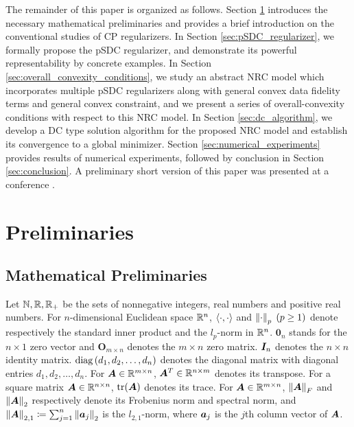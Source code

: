 \documentclass[lettersize,journal]{IEEEtran}
\theoremstyle{plain}%
\theoremstyle{definition}
\theoremstyle{remark}
\begin{document}
The remainder of this paper is organized as follows. Section \ref{sec:preliminaries} introduces the necessary mathematical preliminaries and provides a brief introduction on the conventional studies of CP regularizers. In Section \ref{sec:pSDC_regularizer}, we formally propose the pSDC regularizer, and demonstrate its powerful representability by concrete examples. In Section \ref{sec:overall_convexity_conditions}, we study an abstract NRC model which incorporates multiple pSDC regularizers along with general convex data fidelity terms and general convex constraint, and we present a series of overall-convexity conditions with respect to this NRC model. In Section \ref{sec:dc_algorithm}, we develop a DC type solution algorithm for the proposed NRC model and establish its convergence to a global minimizer. Section \ref{sec:numerical_experiments} provides results of numerical experiments, followed by conclusion in Section \ref{sec:conclusion}. A preliminary short version of this paper was presented at a conference \cite{zhang2022}.

\section{Preliminaries}\label{sec:preliminaries}
\subsection{Mathematical Preliminaries}\label{subsec:notation}
Let $\mathbb{N},\mathbb{R},\mathbb{R}_+$ be the sets of nonnegative integers, real numbers and positive real numbers. For $n$-dimensional Euclidean space $\mathbb{R}^n$, $\langle \cdot, \cdot \rangle$ and $\left\| \cdot \right\|_{p}\;(p\geq 1)$ denote respectively the standard inner product and the $l_p$-norm in $\mathbb{R}^n$. $\mathbf{0}_n$ stands for the $n\times 1$ zero vector and $\mathbf{O}_{m\times n}$ denotes the $m\times n$ zero matrix. $\bm{I}_n$ denotes the $n\times n$ identity matrix. $\mathrm{diag}\left( d_1,d_2,\dots,d_n \right )$ denotes the diagonal matrix with diagonal entries $d_1,d_2,\dots,d_n$. For $\bm{A}\in\mathbb{R}^{m\times n}$, $\bm{A}^T\in\mathbb{R}^{n\times m}$ denotes its transpose. For a square matrix $\bm{A}\in\mathbb{R}^{n\times n}$, $\textrm{tr}(\bm{A})$ denotes its trace. For $\bm{A}\in\mathbb{R}^{m\times n}$, $\left\| \bm{A} \right\|_F$ and $\left\| \bm{A} \right\|_2$ respectively denote its Frobenius norm and spectral norm, and $\left\| \bm{A} \right\|_{2,1}\coloneqq \sum_{j=1}^n\left\| \bm{a}_j \right\|_2$ is the $l_{2,1}$-norm, where $\bm{a}_j$ is the $j$th column vector of $\bm{A}$.
\end{document}
